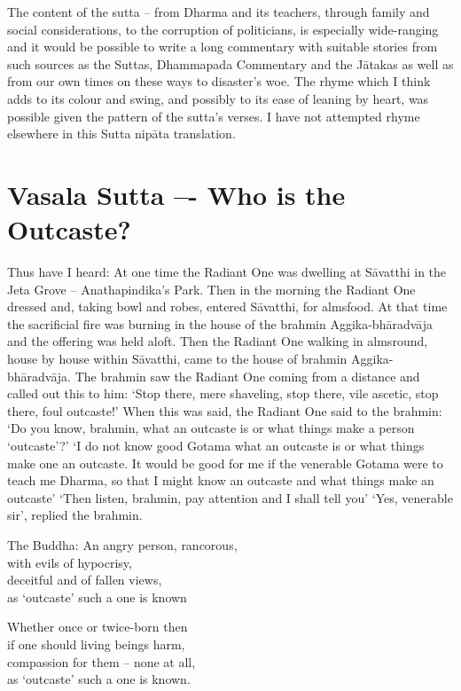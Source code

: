    The content of the sutta – from Dharma and its teachers, through family and social considerations, to the corruption of politicians, is especially wide-ranging and it would be possible to write a long commentary with suitable stories from such sources as the Suttas, Dhammapada Commentary and the J\=atakas as well as from our own times on these ways to disaster's woe.
   The rhyme which I think adds to its colour and swing, and possibly to its ease of leaning by heart, was possible given the pattern of the sutta's verses. I have not attempted rhyme elsewhere in this Sutta nip\=ata translation.
   
   \chapter{Vasala Sutta –- Who is the Outcaste?}
   
   Thus have I heard:
   At one time the Radiant One was dwelling at S\=avatthi in the Jeta Grove – Anathapindika's Park. Then in the morning the Radiant One dressed and, taking bowl and robes, entered S\=avatthi, for almsfood. At that time the sacrificial fire was burning in the house of the brahmin Aggika-bh\=aradv\=aja and the offering was held aloft. Then the Radiant One walking in almsround, house by house within S\=avatthi, came to the house of brahmin Aggika-bh\=aradv\=aja. The brahmin saw the Radiant One coming from a distance and called out this to him: `Stop there, mere shaveling, stop there, vile ascetic, stop there, foul outcaste!' When this was said, the Radiant One said to the brahmin: `Do you know, brahmin, what an outcaste is or what things make a person `outcaste'?'
   `I do not know good Gotama what an outcaste is or what things make one an outcaste. It would be good for me if the venerable Gotama were to teach me Dharma, so that I might know an outcaste and what things make an outcaste'
   `Then listen, brahmin, pay attention and I shall tell you'
   `Yes, venerable sir', replied the brahmin.

\begin{MyDescription}{The Buddha:}
An angry person, rancorous,\\
with evils of hypocrisy,\\
deceitful and of fallen views,\\
as `outcaste' such a one is known
\end{MyDescription}

\begin{MyDescription}{}
Whether once or twice-born then\\
if one should living beings harm,\\
compassion for them – none at all,\\
as `outcaste' such a one is known.
\end{MyDescription}
   
